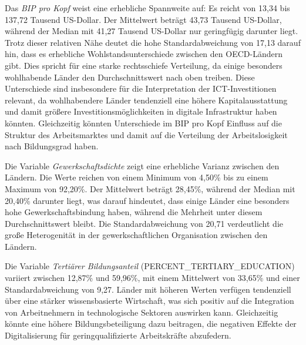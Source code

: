 Das \textit{\ac{BIP} pro Kopf} weist eine erhebliche Spannweite auf: Es reicht von 13,34 bis 
137,72 Tausend US-Dollar. Der Mittelwert beträgt 43,73 Tausend US-Dollar, während der 
Median mit 41,27 Tausend US-Dollar nur geringfügig darunter liegt. Trotz dieser relativen 
Nähe deutet die hohe Standardabweichung von 17,13 darauf hin, dass es erhebliche 
Wohlstandsunterschiede zwischen den \ac{OECD}-Ländern gibt. Dies spricht für eine starke 
rechtsschiefe Verteilung, da einige besonders wohlhabende Länder den Durchschnittswert 
nach oben treiben. Diese Unterschiede sind insbesondere für die Interpretation der 
\ac{ICT}-Investitionen relevant, da wohlhabendere Länder tendenziell eine höhere 
Kapitalausstattung und damit größere Investitionsmöglichkeiten in digitale Infrastruktur 
haben könnten. Gleichzeitig könnten Unterschiede im \ac{BIP} pro Kopf Einfluss auf die 
Struktur des Arbeitsmarktes und damit auf die Verteilung der Arbeitslosigkeit nach 
Bildungsgrad haben.

Die Variable \textit{Gewerkschaftsdichte} zeigt eine erhebliche Varianz zwischen den 
Ländern. Die Werte reichen von einem Minimum von 4,50\% bis zu einem Maximum von 92,20\%. 
Der Mittelwert beträgt 28,45\%, während der Median mit 20,40\% darunter liegt, was darauf 
hindeutet, dass einige Länder eine besonders hohe Gewerkschaftsbindung haben, während die 
Mehrheit unter diesem Durchschnittswert bleibt. Die Standardabweichung von 20,71 
verdeutlicht die große Heterogenität in der gewerkschaftlichen Organisation zwischen den 
Ländern.

Die Variable \textit{Tertiärer Bildungsanteil} (PERCENT\_TERTIARY\_EDUCATION) variiert 
zwischen 12,87\% und 59,96\%, mit einem Mittelwert von 33,65\% und einer Standardabweichung 
von 9,27. Länder mit höheren Werten verfügen tendenziell über eine stärker wissensbasierte 
Wirtschaft, was sich positiv auf die Integration von Arbeitnehmern in technologische Sektoren 
auswirken kann. Gleichzeitig könnte eine höhere Bildungsbeteiligung dazu beitragen, die 
negativen Effekte der Digitalisierung für geringqualifizierte Arbeitskräfte abzufedern.


